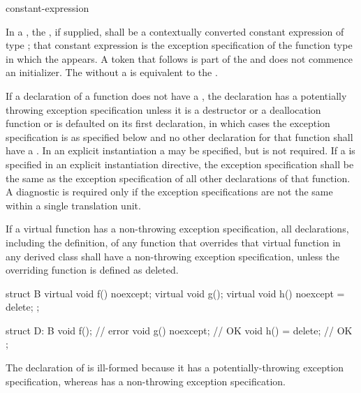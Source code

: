 \begin{bnf}
\br
     \terminal{(} constant-expression \terminal{)}\br
    \br
\end{bnf}

\pnum
{}%
In a , the ,
if supplied, shall be a contextually converted constant expression
of type ;
that constant expression is the exception specification of
the function type in which the  appears.
A \tcode{(} token that follows  is part of the
 and does not commence an
initializer.
The  
without a 
is
equivalent to the 
.

\pnum
If a declaration of a function
does not have a ,
the declaration has a potentially throwing exception specification
unless it is a destructor or a deallocation function
or is defaulted on its first declaration,
in which cases the exception specification
is as specified below
and no other declaration for that function
shall have a .
In an explicit instantiation
a  may be specified,
but is not required.
If a  is specified
in an explicit instantiation directive,
the exception specification shall be the same as
the exception specification of all other declarations of that function.
A diagnostic is required only if the
exception specifications are not the same
within a single translation unit.

\pnum
{}%
If a virtual function has a
non-throwing exception specification,
all declarations, including the definition, of any function
that overrides that virtual function in any derived class
shall have a non-throwing
exception specification,
unless the overriding function is defined as deleted.
\begin{example}
\begin{codeblock}
struct B {
  virtual void f() noexcept;
  virtual void g();
  virtual void h() noexcept = delete;
};

struct D: B {
  void f();                     // error
  void g() noexcept;            // OK
  void h() = delete;            // OK
};
\end{codeblock}

The declaration of
is ill-formed because it
has a potentially-throwing exception specification,
whereas
has a non-throwing exception specification.
\end{example}

